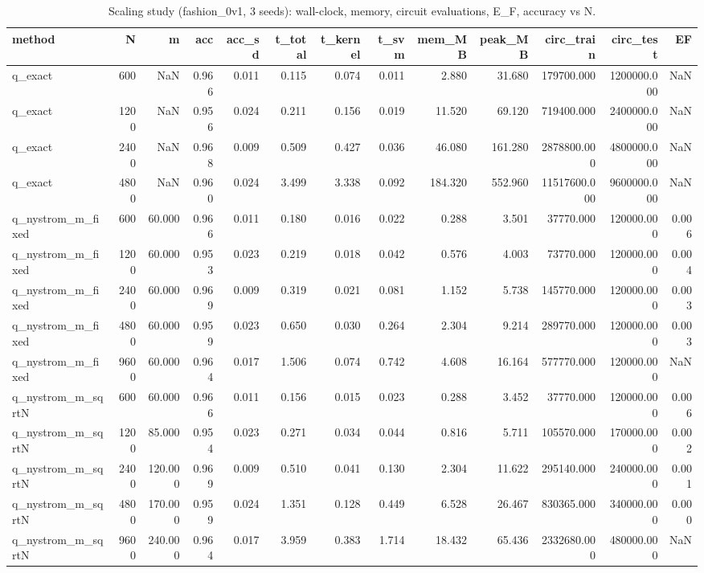 \begin{table}
\caption{Scaling study (fashion_0v1, 3 seeds): wall-clock, memory, circuit evaluations, E_F, accuracy vs N.}
\label{tab:table_scaling}
\begin{tabular}{lrrrrrrrrrrrr}
\toprule
method & N & m & acc & acc\_sd & t\_total & t\_kernel & t\_svm & mem\_MB & peak\_MB & circ\_train & circ\_test & EF \\
\midrule
q\_exact & 600 & NaN & 0.966 & 0.011 & 0.115 & 0.074 & 0.011 & 2.880 & 31.680 & 179700.000 & 1200000.000 & NaN \\
q\_exact & 1200 & NaN & 0.956 & 0.024 & 0.211 & 0.156 & 0.019 & 11.520 & 69.120 & 719400.000 & 2400000.000 & NaN \\
q\_exact & 2400 & NaN & 0.968 & 0.009 & 0.509 & 0.427 & 0.036 & 46.080 & 161.280 & 2878800.000 & 4800000.000 & NaN \\
q\_exact & 4800 & NaN & 0.960 & 0.024 & 3.499 & 3.338 & 0.092 & 184.320 & 552.960 & 11517600.000 & 9600000.000 & NaN \\
q\_nystrom\_m\_fixed & 600 & 60.000 & 0.966 & 0.011 & 0.180 & 0.016 & 0.022 & 0.288 & 3.501 & 37770.000 & 120000.000 & 0.006 \\
q\_nystrom\_m\_fixed & 1200 & 60.000 & 0.953 & 0.023 & 0.219 & 0.018 & 0.042 & 0.576 & 4.003 & 73770.000 & 120000.000 & 0.004 \\
q\_nystrom\_m\_fixed & 2400 & 60.000 & 0.969 & 0.009 & 0.319 & 0.021 & 0.081 & 1.152 & 5.738 & 145770.000 & 120000.000 & 0.003 \\
q\_nystrom\_m\_fixed & 4800 & 60.000 & 0.959 & 0.023 & 0.650 & 0.030 & 0.264 & 2.304 & 9.214 & 289770.000 & 120000.000 & 0.003 \\
q\_nystrom\_m\_fixed & 9600 & 60.000 & 0.964 & 0.017 & 1.506 & 0.074 & 0.742 & 4.608 & 16.164 & 577770.000 & 120000.000 & NaN \\
q\_nystrom\_m\_sqrtN & 600 & 60.000 & 0.966 & 0.011 & 0.156 & 0.015 & 0.023 & 0.288 & 3.452 & 37770.000 & 120000.000 & 0.006 \\
q\_nystrom\_m\_sqrtN & 1200 & 85.000 & 0.954 & 0.023 & 0.271 & 0.034 & 0.044 & 0.816 & 5.711 & 105570.000 & 170000.000 & 0.002 \\
q\_nystrom\_m\_sqrtN & 2400 & 120.000 & 0.969 & 0.009 & 0.510 & 0.041 & 0.130 & 2.304 & 11.622 & 295140.000 & 240000.000 & 0.001 \\
q\_nystrom\_m\_sqrtN & 4800 & 170.000 & 0.959 & 0.024 & 1.351 & 0.128 & 0.449 & 6.528 & 26.467 & 830365.000 & 340000.000 & 0.000 \\
q\_nystrom\_m\_sqrtN & 9600 & 240.000 & 0.964 & 0.017 & 3.959 & 0.383 & 1.714 & 18.432 & 65.436 & 2332680.000 & 480000.000 & NaN \\
\bottomrule
\end{tabular}
\end{table}
